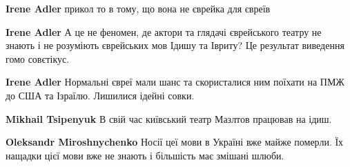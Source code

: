 \begin{itemize}
\begin{itemize}
\begin{itemize}
 
\textbf{Irene Adler} прикол то в тому, що вона не єврейка для євреїв

 
\textbf{Irene Adler} А це не феномен, де актори та глядачі єврейського театру не знають і не розуміють єврейських мов Ідишу та Івриту? Це результат виведення гомо совєтікус.

 
\textbf{Irene Adler} Нормальні євреї мали шанс та скористалися ним поїхати на ПМЖ до США та Ізраїлю. Лишилися ідейні совки.

 
\textbf{Mikhail Tsipenyuk} В свій час київський театр Мазлтов працював на ідиш.

 
\textbf{Oleksandr Miroshnychenko} Носії цеї мови в Україні вже майже померли. Їх нащадки цієї мови вже не знають і більшість має змішані шлюби.

 

\end{itemize}
\end{itemize}
\end{itemize}
